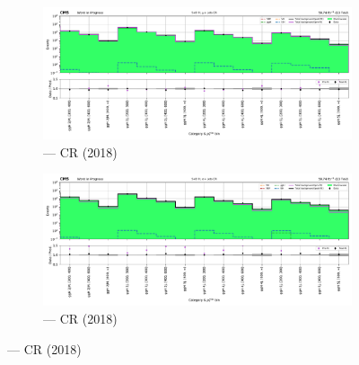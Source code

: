 \begin{figure}[htbp]
    \centering
    \begin{subfigure}[b]{0.49\textwidth}
        \includegraphics[width=\textwidth]{chapters/higgstoinv/figures/mountain_ranges/2018/ggF/Wmunu_tree_fit_s-abs_values_ggF_cats.pdf}
        \caption{\ggH --- \singleMuCr \gls{CR} (2018)}
    \end{subfigure}
    \hfill
    \begin{subfigure}[b]{0.49\textwidth}
        \includegraphics[width=\textwidth]{chapters/higgstoinv/figures/mountain_ranges/2018/ggF/Wenu_tree_fit_s-abs_values_ggF_cats.pdf}
        \caption{\ggH --- \singleEleCr \gls{CR} (2018)}
    \end{subfigure}


\end{figure}
